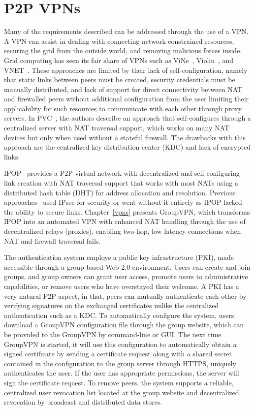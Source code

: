 \section{P2P VPNs}
Many of the requirements described can be addressed through the use of a
VPN.  A VPN can assist in dealing with connecting network constrained resources,
securing the grid from the outside world, and removing malicious forces inside.
Grid computing has seen its fair share of VPNs such as ViNe~\cite{vine},
Violin~\cite{violin}, and VNET~\cite{vnet}.  These approaches are limited by
their lack of self-configuration, namely that static links between peers must
be created, security credentials must be manually distributed, and lack of
support for direct connectivity between NAT and firewalled peers without
additional configuration from the user limiting their applicability for such
resources to communicate with each other through proxy servers.  In
PVC~\cite{pvc}, the authors describe an approach that self-configures through
a centralized server with NAT traversal support, which works on many
NAT devices but only when used without a stateful firewall.  The drawbacks with
this approach are the centralized key distribution center (KDC) and lack of
encrypted links.

IPOP~\cite{ipop} provides a P2P virtual network with decentralized and
self-configuring link creation with NAT traversal support that works with
most NATs using a distributed hash table (DHT) for address
allocation and resolution.  Previous approaches~\cite{grid_appliance} used
IPsec for security or went without it entirely as IPOP lacked the ability to
secure links.  Chapter~\ref{vpns} presents GroupVPN, which transforms IPOP
into an automated VPN with enhanced NAT handling through the use of
decentralized relays (proxies), enabling two-hop, low latency connections when
NAT and firewall traversal fails.

The authentication system employs a public key infrastructure (PKI), made
accessible through a group-based Web 2.0 environment.  Users can create and
join groups, and group owners can grant user access, promote users to
administrative capabilities, or remove users who have overstayed their
welcome.  A PKI has a very natural P2P aspect, in that, peers can mutually
authenticate each other by verifying signatures on the exchanged certificates
unlike the centralized authentication such as a KDC.  To automatically configure
the system, users download a GroupVPN configuration file through the group
website, which can be provided to the GroupVPN by command-line or GUI.  The
next time GroupVPN is started, it will use this configuration to automatically
obtain a signed certificate by sending a certificate request along with a
shared secret contained in the configuration to the group server through HTTPS,
uniquely authenticates the user.  If the user has appropriate permissions, the
server will sign the certificate request.  To remove peers, the system supports
a reliable, centralized user revocation list located at the group website and
decentralized revocation by broadcast and distributed data stores.

